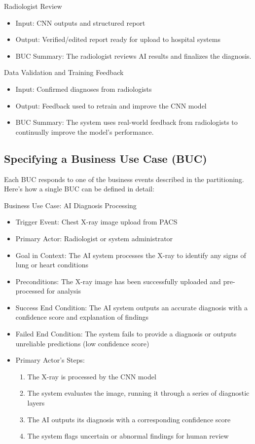 \documentclass[12pt]{article}
\begin{document}
Radiologist Review
\begin{itemize}
    \item Input: CNN outputs and structured report
    \item Output: Verified/edited report ready for upload to hospital systems
    \item BUC Summary: The radiologist reviews AI results and finalizes the diagnosis.
\end{itemize}

Data Validation and Training Feedback
\begin{itemize}
    \item Input: Confirmed diagnoses from radiologists
    \item Output: Feedback used to retrain and improve the CNN model
    \item BUC Summary: The system uses real-world feedback from radiologists to continually improve the model's performance.
\end{itemize}

\subsection{Specifying a Business Use Case (BUC)}
Each BUC responds to one of the business events described in the partitioning. Here's how a single BUC can be defined in detail:

Business Use Case: AI Diagnosis Processing
\begin{itemize}
    \item Trigger Event: Chest X-ray image upload from PACS
    \item Primary Actor: Radiologist or system administrator
    \item Goal in Context: The AI system processes the X-ray to identify any signs of lung or heart conditions
    \item Preconditions: The X-ray image has been successfully uploaded and pre-processed for analysis
    \item Success End Condition: The AI system outputs an accurate diagnosis with a confidence score and explanation of findings
    \item Failed End Condition: The system fails to provide a diagnosis or outputs unreliable predictions (low confidence score)
    \item {
        Primary Actor's Steps:
        \begin{enumerate}
            \item The X-ray is processed by the CNN model
            \item The system evaluates the image, running it through a series of diagnostic layers
            \item The AI outputs its diagnosis with a corresponding confidence score
            \item The system flags uncertain or abnormal findings for human review
        \end{enumerate}
    }
\end{itemize}
\end{document}
